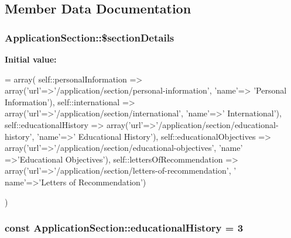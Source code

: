 \subsection{Member Data Documentation}
\hypertarget{class_application_section_ab90668ddbdbf30045d89dba35051702c}{
\subsubsection[{\$section\-Details}]{\setlength{\rightskip}{0pt plus 5cm}Application\-Section\-::\$section\-Details\hspace{0.3cm}{\ttfamily [static]}}}\label{class_application_section_ab90668ddbdbf30045d89dba35051702c}
{\bfseries Initial value\-:}
\begin{DoxyCode}
= array(
        self::personalInformation     => array(\textcolor{stringliteral}{'url'}=>\textcolor{stringliteral}{'/application/section/personal-information'}, \textcolor{stringliteral}{'name'}=>\textcolor{stringliteral}{
      'Personal Information'}),
        self::international           => array(\textcolor{stringliteral}{'url'}=>\textcolor{stringliteral}{'/application/section/international'}, \textcolor{stringliteral}{'name'}=>\textcolor{stringliteral}{'
      International'}),
        self::educationalHistory      => array(\textcolor{stringliteral}{'url'}=>\textcolor{stringliteral}{'/application/section/educational-history'}, \textcolor{stringliteral}{'name'}=>\textcolor{stringliteral}{'
      Educational History'}),
        self::educationalObjectives   => array(\textcolor{stringliteral}{'url'}=>\textcolor{stringliteral}{'/application/section/educational-objectives'}, \textcolor{stringliteral}{'name'}
      =>\textcolor{stringliteral}{'Educational Objectives'}),
        self::lettersOfRecommendation => array(\textcolor{stringliteral}{'url'}=>\textcolor{stringliteral}{'/application/section/letters-of-recommendation'}, \textcolor{stringliteral}{'
      name'}=>\textcolor{stringliteral}{'Letters of Recommendation'})

        )
\end{DoxyCode}
\hypertarget{class_application_section_a6710b1bd47aefc8a4cd13fd475a3cf9a}{
\subsubsection[{educational\-History}]{\setlength{\rightskip}{0pt plus 5cm}const Application\-Section\-::educational\-History = 3}}\label{class_application_section_a6710b1bd47aefc8a4cd13fd475a3cf9a}
